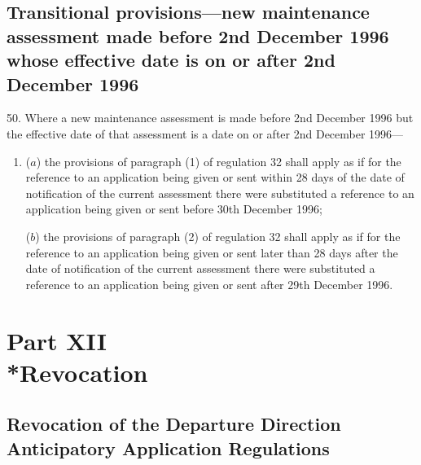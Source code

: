 \documentclass[a4paper]{article}
\newcommand{\parthead}{}
\begin{document}
\subsection[50. Transitional provisions—new maintenance assessment made before 2nd December 1996
whose effective date is on or after 2nd December 1996]{Transitional provisions—new maintenance assessment made before 2nd December 1996
whose effective date is on or after 2nd December 1996}

50. Where a new maintenance
assessment is made before 2nd December 1996 but the effective date of that
assessment is a date on or after 2nd December 1996—
\begin{enumerate}\item[]
($a$) the provisions of paragraph (1) of regulation 32 shall apply as if for the
reference to an application being given or sent within 28 days of the date of
notification of the current assessment there were substituted a reference to an
application being given or sent before 30th December 1996;

($b$) the provisions of paragraph (2) of regulation 32 shall apply as if for the
reference to an application being given or sent later than 28 days after the
date of notification of the current assessment there were substituted a
reference to an application being given or sent after 29th December 1996.
\end{enumerate}

\section[Part XII --- Revocation]{Part XII\\*Revocation}

\renewcommand\parthead{--- Part XII}

\subsection[51. Revocation of the Departure Direction Anticipatory Application
Regulations]{Revocation of the Departure Direction Anticipatory Application
Regulations}
\end{document}
